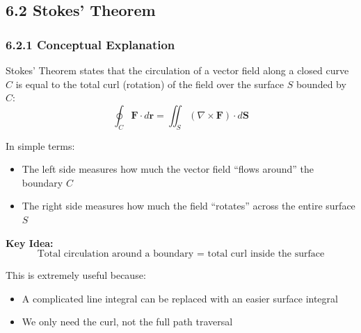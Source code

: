 \subsection*{6.2 Stokes' Theorem}

\subsubsection*{6.2.1 Conceptual Explanation}

\begin{conceptbox}
    Stokes' Theorem states that the circulation of a vector field along a closed curve $C$ is equal to the total curl (rotation) of the field over the surface $S$ bounded by $C$:
    \begin{equation*}
        \oint_C \mathbf{F} \cdot d\mathbf{r}
        =
        \iint_S (\nabla \times \mathbf{F}) \cdot d\mathbf{S}
    \end{equation*}
\end{conceptbox}

In simple terms:
\begin{itemize}
    \item The left side measures how much the vector field “flows around” the boundary $C$
    \item The right side measures how much the field “rotates” across the entire surface $S$
\end{itemize}

\textbf{Key Idea:}
\[
    \boxed{\text{Total circulation around a boundary = total curl inside the surface}}
\]

This is extremely useful because:
\begin{itemize}
    \item A complicated line integral can be replaced with an easier surface integral
    \item We only need the curl, not the full path traversal
\end{itemize}

